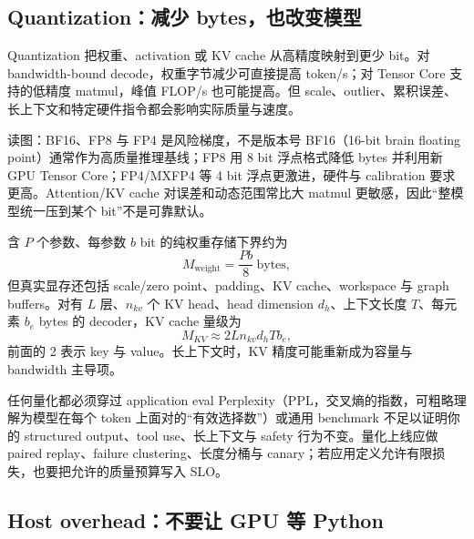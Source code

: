 
\subsection{Quantization：减少 bytes，也改变模型}

Quantization 把权重、activation 或 KV cache 从高精度映射到更少 bit。对 bandwidth-bound decode，权重字节减少可直接提高 token/s；对 Tensor Core 支持的低精度 matmul，峰值 FLOP/s 也可能提高。但 scale、outlier、累积误差、长上下文和特定硬件指令都会影响实际质量与速度。


\begin{knowledgebox}{读图：BF16、FP8 与 FP4 是风险梯度，不是版本号}
BF16（16-bit brain floating point）通常作为高质量推理基线；FP8 用 8 bit 浮点格式降低 bytes 并利用新 GPU Tensor Core；FP4/MXFP4 等 4 bit 浮点更激进，硬件与 calibration 要求更高。Attention/KV cache 对误差和动态范围常比大 matmul 更敏感，因此“整模型统一压到某个 bit”不是可靠默认。
\end{knowledgebox}

含 $P$ 个参数、每参数 $b$ bit 的纯权重存储下界约为
\[
M_{\mathrm{weight}}=\frac{Pb}{8}\ \mathrm{bytes},
\]
但真实显存还包括 scale/zero point、padding、KV cache、workspace 与 graph buffers。对有 $L$ 层、$n_{kv}$ 个 KV head、head dimension $d_h$、上下文长度 $T$、每元素 $b_e$ bytes 的 decoder，KV cache 量级为
\[
M_{KV}\approx 2L n_{kv}d_h T b_e,
\]
前面的 2 表示 key 与 value。长上下文时，KV 精度可能重新成为容量与 bandwidth 主导项。

\begin{warningbox}{任何量化都必须穿过 application eval}
Perplexity（PPL，交叉熵的指数，可粗略理解为模型在每个 token 上面对的“有效选择数”）或通用 benchmark 不足以证明你的 structured output、tool use、长上下文与 safety 行为不变。量化上线应做 paired replay、failure clustering、长度分桶与 canary；若应用定义允许有限损失，也要把允许的质量预算写入 SLO。
\end{warningbox}

\subsection{Host overhead：不要让 GPU 等 Python}

